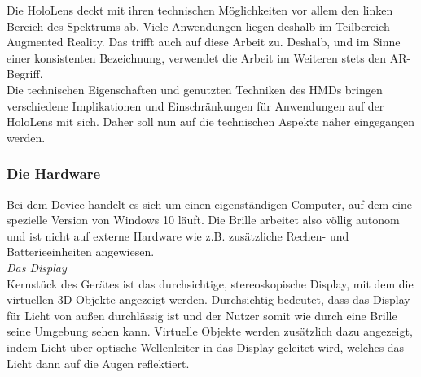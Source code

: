 Die HoloLens deckt mit ihren technischen Möglichkeiten vor allem den linken Bereich des Spektrums ab. Viele Anwendungen liegen deshalb im Teilbereich Augmented Reality. Das trifft auch auf diese Arbeit zu. Deshalb, und im Sinne einer konsistenten Bezeichnung, verwendet die Arbeit im Weiteren stets den AR-Begriff.\\

Die technischen Eigenschaften und genutzten Techniken des HMDs bringen verschiedene Implikationen und Einschränkungen für Anwendungen auf der HoloLens mit sich. Daher soll nun auf die technischen Aspekte näher eingegangen werden.\\

\subsubsection{Die Hardware}
\label{sec-2-1-2}
Bei dem Device handelt es sich um einen eigenständigen Computer, auf dem eine spezielle Version von Windows 10 läuft. Die Brille arbeitet also völlig autonom und ist nicht auf externe Hardware wie z.B. zusätzliche Rechen- und Batterieeinheiten angewiesen.\\

\vspace{4px}
\textit{Das Display}\\
Kernstück des Gerätes ist das durchsichtige, stereoskopische Display, mit dem die virtuellen 3D-Objekte angezeigt werden. Durchsichtig bedeutet, dass das Display für Licht von außen durchlässig ist und der Nutzer somit wie durch eine Brille seine Umgebung sehen kann. Virtuelle Objekte werden zusätzlich dazu angezeigt, indem Licht über optische Wellenleiter in das Display geleitet wird, welches das Licht dann auf die Augen reflektiert.\\

